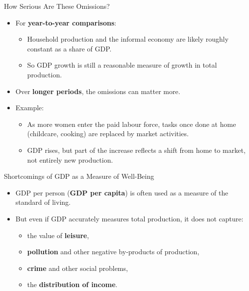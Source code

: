 \documentclass[aspectratio=169]{beamer}
\begin{document}
\begin{frame}{How Serious Are These Omissions?}
\transfade
\begin{itemize}
  \item For \textbf{year-to-year comparisons}:
  \begin{itemize}
    \item Household production and the informal economy are likely roughly constant as a share of GDP.
    \item So GDP growth is still a reasonable measure of growth in total production.
  \end{itemize}
  \item Over \textbf{longer periods}, the omissions can matter more.
  \item Example:
  \begin{itemize}
    \item As more women enter the paid labour force, tasks once done at home (childcare, cooking) are replaced by market activities.
    \item GDP rises, but part of the increase reflects a \alert{shift from home to market}, not entirely new production.
  \end{itemize}
\end{itemize}
\end{frame}

\begin{frame}{Shortcomings of GDP as a Measure of Well-Being}
\transfade
\begin{itemize}
  \item GDP per person (\textbf{GDP per capita}) is often used as a measure of the \alert{standard of living}.
  \item But even if GDP accurately measures total production, it does not capture:
  \begin{itemize}
    \item the value of \textbf{leisure},
    \item \textbf{pollution} and other negative by-products of production,
    \item \textbf{crime} and other social problems,
    \item the \textbf{distribution of income}.
  \end{itemize}
\end{itemize}
\end{frame}
\end{document}
